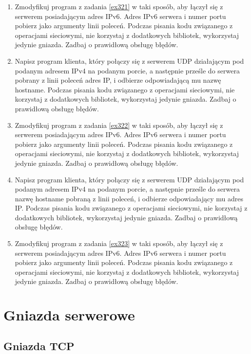 \documentclass{article}
\begin{document}
\begin{enumerate}[label=\textbf{3.\arabic*}, resume]
\item  Zmodyfikuj program z zadania \ref{ex321} w taki sposób,  aby łączył się z serwerem posiadającym adres IPv6. Adres IPv6 serwera i numer portu pobierz jako argumenty linii poleceń. Podczas pisania kodu związanego z operacjami sieciowymi, nie korzystaj z dodatkowych bibliotek, wykorzystaj jedynie gniazda. Zadbaj o prawidłową obsługę błędów. 

\item \label{ex322} Napisz program klienta, który połączy się z serwerem UDP działającym pod podanym adresem IPv4 na podanym porcie, a następnie prześle do serwera pobrany z linii poleceń adres IP, i odbierze odpowiadającą mu nazwę hostname. Podczas pisania kodu związanego z operacjami sieciowymi, nie korzystaj z dodatkowych bibliotek, wykorzystaj jedynie gniazda. Zadbaj o prawidłową obsługę błędów. 

\item  Zmodyfikuj program z zadania \ref{ex322} w taki sposób,  aby łączył się z serwerem posiadającym adres IPv6. Adres IPv6 serwera i numer portu pobierz jako argumenty linii poleceń. Podczas pisania kodu związanego z operacjami sieciowymi, nie korzystaj z dodatkowych bibliotek, wykorzystaj jedynie gniazda. Zadbaj o prawidłową obsługę błędów. 

\item \label{ex323} Napisz program klienta, który połączy się z serwerem UDP działającym pod podanym adresem IPv4 na podanym porcie, a następnie prześle do serwera nazwę hostname pobraną z linii poleceń, i odbierze odpowiadający mu adres IP.  Podczas pisania kodu związanego z operacjami sieciowymi, nie korzystaj z dodatkowych bibliotek, wykorzystaj jedynie gniazda. Zadbaj o prawidłową obsługę błędów. 

\item Zmodyfikuj program z zadania \ref{ex323} w taki sposób,  aby łączył się z serwerem posiadającym adres IPv6. Adres IPv6 serwera i numer portu pobierz jako argumenty linii poleceń. Podczas pisania kodu związanego z operacjami sieciowymi, nie korzystaj z dodatkowych bibliotek, wykorzystaj jedynie gniazda. Zadbaj o prawidłową obsługę błędów. 
\end{enumerate}

\newpage
\section{Gniazda serwerowe}

\subsection*{Gniazda TCP}
\end{document}
